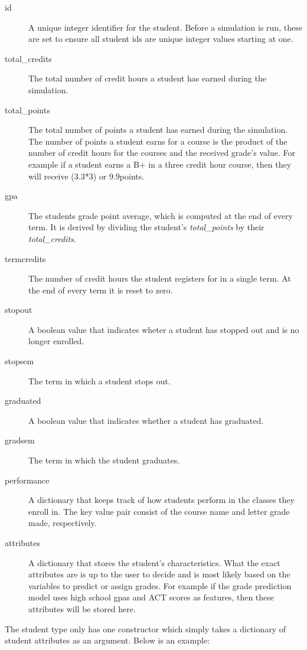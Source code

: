 \documentclass[botnum, fleqn]{unmeethesis}
\begin{document}
\begin{description}
\item [id] A unique integer identifier for the student. Before a simulation is run, these are set to ensure all student ids are unique integer values starting at one.
\item [total\_credits] The total number of credit hours a student has earned during the simulation.
\item [total\_points] The total number of points a student has earned during the simulation. The number of points a student earns for a course is the product of the number of credit hours for the courses and the received grade's value. For example if a student earns a B+ in a three credit hour course, then they will receive (3.3*3) or 9.9points.
\item [gpa] The students grade point average, which is computed at the end of every term. It is derived by dividing the student's \textit{total\_points} by their \textit{total\_credits}.
\item [termcredits] The number of credit hours the student registers for in a single term. At the end of every term it is reset to zero.
\item [stopout] A boolean value that indicates wheter a student has stopped out and is no longer enrolled.
\item [stopsem] The term in which a student stops out.
\item [graduated] A boolean value that indicates whether a student has graduated.
\item [gradsem] The term in which the student graduates.
\item [performance] A dictionary that keeps track of how students perform in the classes they enroll in. The key value pair consist of the course name and letter grade made, respectively.
\item [attributes] A dictionary that stores the student's characteristics. What the exact attributes are is up to the user to decide and is most likely based on the variables to predict or assign grades. For example if the grade prediction model uses high school gpas and ACT scores as features, then these attributes will be stored here.
\end{description}

The student type only has one constructor which simply takes a dictionary of student attributes as an argument. Below is an example:


\end{document}
